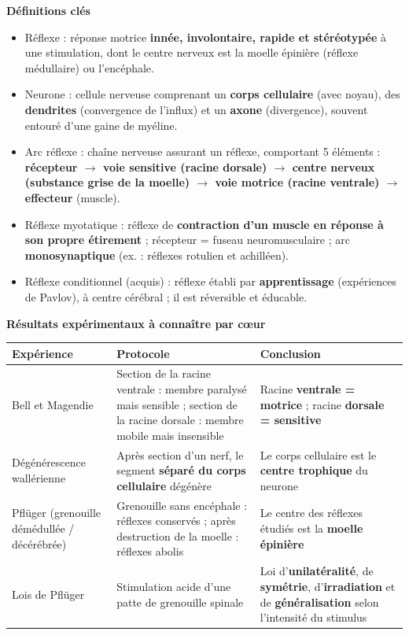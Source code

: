 \documentclass[11pt]{article}
\newcommand{\cle}[1]{{\popxbold\color{popdark}#1}}
\begin{document}
\begin{bilan}
\textbf{Définitions clés}
\begin{itemize}
  \item \cle{Réflexe} : réponse motrice \textbf{innée, involontaire, rapide et stéréotypée} à une stimulation, dont le centre nerveux est la moelle épinière (réflexe médullaire) ou l'encéphale.
  \item \cle{Neurone} : cellule nerveuse comprenant un \textbf{corps cellulaire} (avec noyau), des \textbf{dendrites} (convergence de l'influx) et un \textbf{axone} (divergence), souvent entouré d'une gaine de myéline.
  \item \cle{Arc réflexe} : chaîne nerveuse assurant un réflexe, comportant 5 éléments : \textbf{récepteur $\rightarrow$ voie sensitive (racine dorsale) $\rightarrow$ centre nerveux (substance grise de la moelle) $\rightarrow$ voie motrice (racine ventrale) $\rightarrow$ effecteur} (muscle).
  \item \cle{Réflexe myotatique} : réflexe de \textbf{contraction d'un muscle en réponse à son propre étirement} ; récepteur = fuseau neuromusculaire ; arc \textbf{monosynaptique} (ex. : réflexes rotulien et achilléen).
  \item \cle{Réflexe conditionnel (acquis)} : réflexe établi par \textbf{apprentissage} (expériences de Pavlov), à centre cérébral ; il est réversible et éducable.
\end{itemize}

\textbf{Résultats expérimentaux à connaître par c\oe ur}
\begin{center}
\begin{tabularx}{\linewidth}{|l|X|X|}
\hline
\rowcolor{popblueL} \textbf{Expérience} & \textbf{Protocole} & \textbf{Conclusion} \\
\hline
Bell et Magendie & Section de la racine ventrale : membre paralysé mais sensible ; section de la racine dorsale : membre mobile mais insensible & Racine \textbf{ventrale = motrice} ; racine \textbf{dorsale = sensitive} \\
\hline
Dégénérescence wallérienne & Après section d'un nerf, le segment \textbf{séparé du corps cellulaire} dégénère & Le corps cellulaire est le \textbf{centre trophique} du neurone \\
\hline
Pflüger (grenouille démédullée / décérébrée) & Grenouille sans encéphale : réflexes conservés ; après destruction de la moelle : réflexes abolis & Le centre des réflexes étudiés est la \textbf{moelle épinière} \\
\hline
Lois de Pflüger & Stimulation acide d'une patte de grenouille spinale & Loi d'\textbf{unilatéralité}, de \textbf{symétrie}, d'\textbf{irradiation} et de \textbf{généralisation} selon l'intensité du stimulus \\
\hline
\end{tabularx}
\end{center}


\end{bilan}
\end{document}
